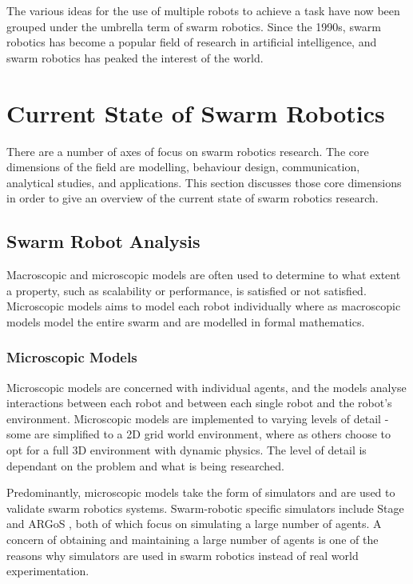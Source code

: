 The various ideas for the use of multiple robots to achieve a task have now been grouped under the umbrella term of swarm robotics. Since the 1990s, swarm robotics has become a popular field of research in artificial intelligence, and swarm robotics has peaked the interest of the world. 


\section{Current State of Swarm Robotics}
\label{currentstate}

There are a number of axes of focus on swarm robotics research. The core dimensions of the field are modelling, behaviour design, communication, analytical studies, and applications. This section discusses those core dimensions in order to give an overview of the current state of swarm robotics research. 

\subsection{Swarm Robot Analysis}
Macroscopic and microscopic models are often used to determine to what extent a property, such as scalability or performance, is satisfied or not satisfied. Microscopic models aims to model each robot individually where as macroscopic models model the entire swarm and are modelled in formal mathematics.

\subsubsection{Microscopic Models}
\label{microscopicmodels}

Microscopic models are concerned with individual agents, and the models analyse interactions between each robot and between each single robot and the robot's environment. Microscopic models are implemented to varying levels of detail - some are simplified to a 2D grid world environment, where as others choose to opt for a full 3D environment with dynamic physics. The level of detail is dependant on the problem and what is being researched. 

Predominantly, microscopic models take the form of simulators and are used to validate swarm robotics systems. Swarm-robotic specific simulators include Stage \cite{vaughan2008massively} and ARGoS \cite{pinciroli2011argos}, both of which focus on simulating a large number of agents. A concern of obtaining and maintaining a large number of agents is one of the reasons why simulators are used in swarm robotics instead of real world experimentation.

